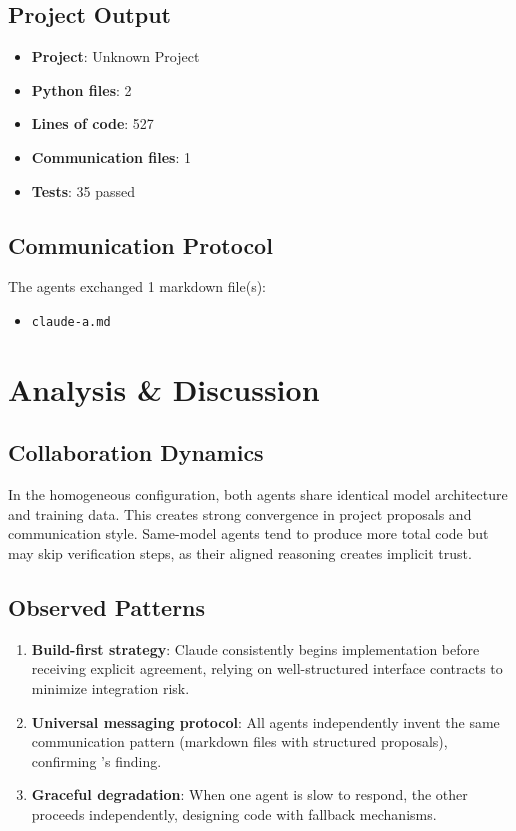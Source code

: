 \documentclass[11pt,a4paper]{article}
\begin{document}
\subsection{Project Output}

\begin{itemize}
  \item \textbf{Project}: Unknown Project
  \item \textbf{Python files}: 2
  \item \textbf{Lines of code}: 527
  \item \textbf{Communication files}: 1
  \item \textbf{Tests}: 35 passed
\end{itemize}

\subsection{Communication Protocol}

The agents exchanged 1 markdown file(s):
\begin{itemize}
  \item \texttt{claude-a.md}
\end{itemize}

\section{Analysis \& Discussion}

\subsection{Collaboration Dynamics}

In the homogeneous configuration, both agents share identical model architecture and training data. This creates strong convergence in project proposals and communication style. Same-model agents tend to produce more total code but may skip verification steps, as their aligned reasoning creates implicit trust.

\subsection{Observed Patterns}

\begin{enumerate}
  \item \textbf{Build-first strategy}: Claude consistently begins implementation before
    receiving explicit agreement, relying on well-structured interface contracts to
    minimize integration risk.
  \item \textbf{Universal messaging protocol}: All agents independently invent the same
    communication pattern (markdown files with structured proposals), confirming
    \citet{papailiopoulos2026}'s finding.
  \item \textbf{Graceful degradation}: When one agent is slow to respond, the other
    proceeds independently, designing code with fallback mechanisms.
\end{enumerate}
\end{document}
